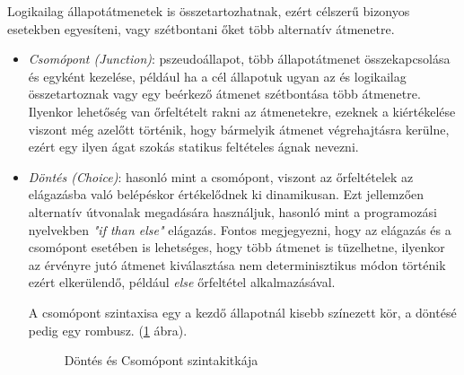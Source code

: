 \linebreak Logikailag állapotátmenetek is összetartozhatnak, ezért célszerű bizonyos esetekben egyesíteni, vagy szétbontani őket több alternatív átmenetre.
\begin{itemize}
	\item \emph{Csomópont (Junction)}: pszeudoállapot, több állapotátmenet összekapcsolása és egyként kezelése, például ha a cél állapotuk ugyan az és logikailag összetartoznak vagy egy beérkező átmenet szétbontása több átmenetre. Ilyenkor lehetőség van őrfeltételt rakni az átmenetekre, ezeknek a kiértékelése viszont még azelőtt történik, hogy bármelyik átmenet végrehajtásra kerülne, ezért egy ilyen ágat szokás statikus feltételes ágnak nevezni.
	\item \emph{Döntés (Choice)}: hasonló mint a csomópont, viszont az őrfeltételek az elágazásba való belépéskor értékelődnek ki dinamikusan. Ezt jellemzően alternatív útvonalak megadására használjuk, hasonló mint a programozási nyelvekben \emph{"if than else"} elágazás. Fontos megjegyezni, hogy az elágazás és a csomópont esetében is lehetséges, hogy több átmenet is tüzelhetne, ilyenkor az érvényre jutó átmenet kiválasztása nem determinisztikus módon történik ezért elkerülendő, például \emph{else} őrfeltétel alkalmazásával.
	
	A csomópont szintaxisa egy a kezdő állapotnál kisebb színezett kör, a döntésé pedig egy rombusz. (\ref{fig:choice-junction} ábra).
	

	\begin{figure}[!ht]
		\centering
		\vspace{1cm}	
		\caption{Döntés és Csomópont szintakitkája}
		\label{fig:choice-junction}
	\end{figure}

	
	
	
\end{itemize}

